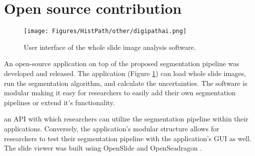 \documentclass[times,twocolumn,final,authoryear]{tmp}
\begin{document}
\section{Open source contribution}
\label{path_sec:open_contrib}
\begin{figure}
    \texttt{[image: Figures/HistPath/other/digipathai.png]}
    \caption{User interface of the whole slide image analysis software.}
    \label{path_fig:digipathai}
\end{figure}
An open-source application \citep{digipathai} on top of the proposed segmentation pipeline was developed and released. The application (Figure \ref{path_fig:digipathai}) can load whole slide images, run the segmentation algorithm, and calculate the uncertainties. The software is modular making it easy for researchers to easily add their own segmentation pipelines or extend it's functionality. 

an API with which researchers can utilize the segmentation pipeline within their applications. Conversely, the application's modular structure allows for researchers to test their segmentation pipeline with the application's GUI as well. The slide viewer was built using OpenSlide \citep{goode2013openslide} and OpenSeadragon \citep{openseadragon}.
\end{document}

